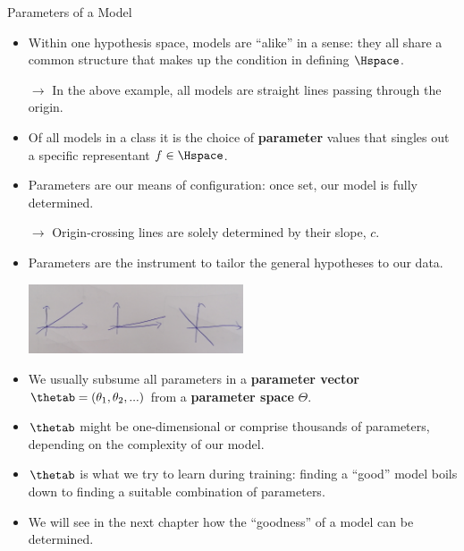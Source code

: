 \documentclass[11pt,compress,t,notes=noshow, xcolor=table]{beamer}
\begin{document}
\begin{vbframe}{Parameters of a Model}

\begin{itemize}

  \item Within one hypothesis space, models are \enquote{alike} in a sense: they 
  all share a common structure that makes up the condition in defining 
  $\Hspace$.
  
  $\rightarrow$ In the above example, all models are straight lines passing
  through the origin.
    
  \item Of all models in a class it is the choice of \textbf{parameter} values 
  that singles out a specific representant $f \in \Hspace$.
  
  \item Parameters are our means of configuration: once set, our model is fully
  determined.
  
  $\rightarrow$ Origin-crossing lines are solely determined by their slope, $c$.
  
  \item Parameters are the instrument to tailor the general 
  hypotheses to our data.

  
  \begin{center}
    \includegraphics[width = 0.5\textwidth]{figure_man/lines.jpg} 
  \end{center}
  
  \framebreak
  
  \item We usually subsume all parameters in a \textbf{parameter vector} 
  $\thetab = (\theta_1, \theta_2, ...)$ from a \textbf{parameter space} 
  $\Theta$.
  
  \item $\thetab$ might be one-dimensional or comprise thousands of parameters,
  depending on the complexity of our model.
  
  \item $\thetab$ is what we try to learn during training: finding a 
  \enquote{good} model boils down to finding a suitable combination of 
  parameters.
  
  \item We will see in the next chapter how the \enquote{goodness} of a model 
  can be determined.
  
\end{itemize}

\end{vbframe}
\end{document}
